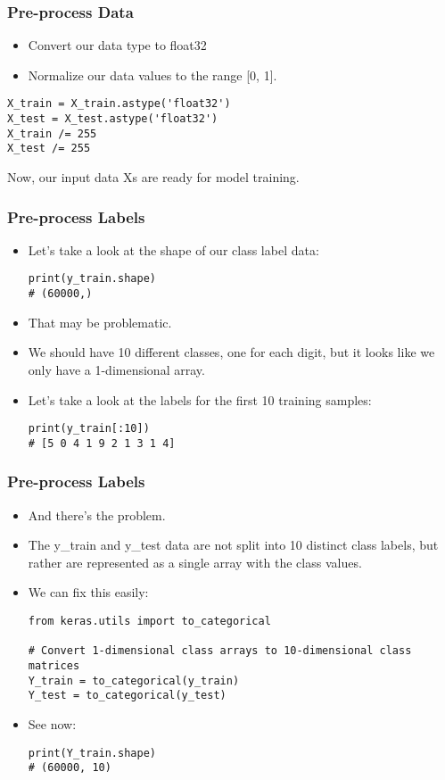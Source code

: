 \begin{frame}[fragile] \frametitle{Pre-process Data}

\begin{itemize}
\item Convert our data type to float32
\item Normalize our data values to the range [0, 1].
\end{itemize}
\begin{lstlisting}
X_train = X_train.astype('float32')
X_test = X_test.astype('float32')
X_train /= 255
X_test /= 255
\end{lstlisting}
Now, our input data Xs are ready for model training.
\end{frame}

\begin{frame}[fragile] \frametitle{Pre-process Labels}

\begin{itemize}
\item Let's take a look at the shape of our class label data:
\begin{lstlisting}
print(y_train.shape)
# (60000,)
\end{lstlisting}
\item That may be problematic. 
\item We should have 10 different classes, one for each digit, but it looks like we only have a 1-dimensional array.
\item Let's take a look at the labels for the first 10 training samples:
\begin{lstlisting}
print(y_train[:10])
# [5 0 4 1 9 2 1 3 1 4]
\end{lstlisting}
\end{itemize}
\end{frame}


\begin{frame}[fragile] \frametitle{Pre-process Labels}

\begin{itemize}
\item And there's the problem. 
\item The y\_train and y\_test data are not split into 10 distinct class labels, but rather are represented as a single array with the class values.
\item We can fix this easily:
\begin{lstlisting}
from keras.utils import to_categorical

# Convert 1-dimensional class arrays to 10-dimensional class matrices
Y_train = to_categorical(y_train)
Y_test = to_categorical(y_test)
\end{lstlisting}
\item See now:
\begin{lstlisting}
print(Y_train.shape)
# (60000, 10)
\end{lstlisting}
\end{itemize}
\end{frame}


